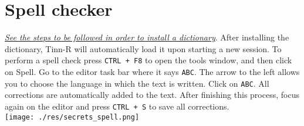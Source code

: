
\section{Spell checker}

\textit{\href{\#configuration\_spellerinstalation}{See the steps to be followed in order to install a dictionary}}.
After installing the dictionary, Tinn-R will automatically load it upon starting a new session.
To perform a spell check press \texttt{CTRL + F8} to open the tools window, and then click on Spell.
Go to the editor task bar where it says \texttt{ABC}.
The arrow to the left allows you to choose the language in which the text is written.
Click on \texttt{ABC}. All corrections are automatically added to the text. After finishing this process,
focus again on the editor and press \texttt{CTRL + S} to save all corrections.\\

\texttt{[image: ./res/secrets\_spell.png]}\\
